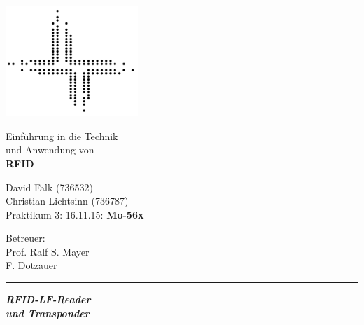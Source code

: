 \documentclass[paper=a4,fontsize=11pt,headsepline,footsepline,parskip=half]{scrartcl}
\begin{document}
\begin{titlepage}

\begin{minipage}[c]{5cm}
\includegraphics[width=5cm]{../logofbi}
\end{minipage}
\hfill
\begin{minipage}[c]{10cm}
\begin{flushright}
\Large Einführung in die Technik\\und Anwendung von\\
\LARGE \textbf{RFID}
\end{flushright}
\end{minipage}

\vspace*{1cm}

\begin{minipage}[c]{9cm}
\begin{flushleft}
\large David Falk (736532)\\Christian Lichtsinn (736787)\\Praktikum 3: 16.11.15: \textbf{Mo-56x}
\end{flushleft}
\end{minipage}
\hfill
\begin{minipage}[c]{7cm}
\begin{flushright}
\large Betreuer:\\Prof. Ralf S. Mayer\\F. Dotzauer
\end{flushright}
\end{minipage}

\vspace*{1cm}

\begingroup
  \setlength{\parskip}{0pt}%
  \setlength{\parindent}{0pt}%
  \setlength{\parfillskip}{0pt plus 1fil}%
  \par\rule{\linewidth}{1.5pt}\par
\endgroup


\centering
\Huge{\textbf{\textsl{RFID-LF-Reader\\ und Transponder}}}


\end{titlepage}
\end{document}

